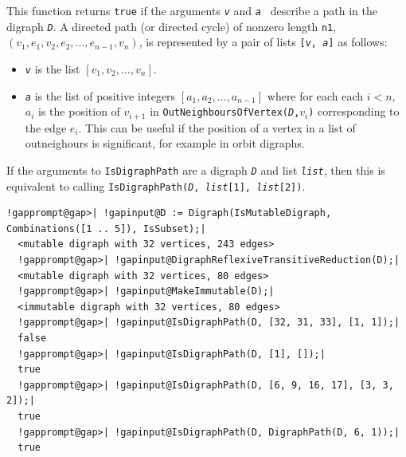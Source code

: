 \documentclass[a4paper,11pt]{report}
\begin{document}
{{{ This function returns \texttt{true} if the arguments \mbox{\texttt{\mdseries\slshape v}} and \mbox{\texttt{\mdseries\slshape a }} describe a path in the digraph \mbox{\texttt{\mdseries\slshape D}}. A directed path (or directed cycle) of non\texttt{}zero length \texttt{n\texttt{}1}, $(v_1, e_1, v_2, e_2, ..., e_{n-1}, v_n)$, is represented by a pair of lists \texttt{[\mbox{\texttt{\mdseries\slshape v}}, \mbox{\texttt{\mdseries\slshape a}}]} as follows: 
\begin{itemize}
\item  \mbox{\texttt{\mdseries\slshape v}} is the list $[v_1, v_2, ..., v_n]$. 
\item  \mbox{\texttt{\mdseries\slshape a}} is the list of positive integers $[a_1, a_2, ..., a_{n-1}]$ where for each each $i < n$, $a_i$ is the position of $v_{i+1}$ in \texttt{OutNeighboursOfVertex(}\mbox{\texttt{\mdseries\slshape D}}\texttt{,}$v_i$\texttt{)} corresponding to the edge $e_i$. This can be useful if the position of a vertex in a list of
out\texttt{}neighours is significant, for example in orbit
digraphs. 
\end{itemize}
 If the arguments to \texttt{IsDigraphPath} are a digraph \mbox{\texttt{\mdseries\slshape D}} and list \mbox{\texttt{\mdseries\slshape list}}, then this is equivalent to calling \texttt{IsDigraphPath(\mbox{\texttt{\mdseries\slshape D}}, \mbox{\texttt{\mdseries\slshape list}}[1], \mbox{\texttt{\mdseries\slshape list}}[2])}. 
\begin{Verbatim}[commandchars=!@|,fontsize=\small,frame=single,label=Example]
  !gapprompt@gap>| !gapinput@D := Digraph(IsMutableDigraph, Combinations([1 .. 5]), IsSubset);|
  <mutable digraph with 32 vertices, 243 edges>
  !gapprompt@gap>| !gapinput@DigraphReflexiveTransitiveReduction(D);|
  <mutable digraph with 32 vertices, 80 edges>
  !gapprompt@gap>| !gapinput@MakeImmutable(D);|
  <immutable digraph with 32 vertices, 80 edges>
  !gapprompt@gap>| !gapinput@IsDigraphPath(D, [32, 31, 33], [1, 1]);|
  false
  !gapprompt@gap>| !gapinput@IsDigraphPath(D, [1], []);|
  true
  !gapprompt@gap>| !gapinput@IsDigraphPath(D, [6, 9, 16, 17], [3, 3, 2]);|
  true
  !gapprompt@gap>| !gapinput@IsDigraphPath(D, DigraphPath(D, 6, 1));|
  true
\end{Verbatim}
 }

 

}}
\end{document}
